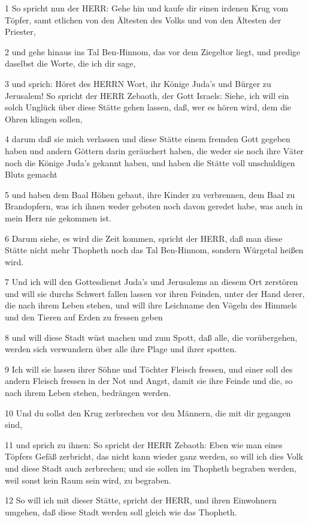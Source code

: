 \par 1 So spricht nun der HERR: Gehe hin und kaufe dir einen irdenen Krug vom Töpfer, samt etlichen von den Ältesten des Volks und von den Ältesten der Priester,
\par 2 und gehe hinaus ins Tal Ben-Hinnom, das vor dem Ziegeltor liegt, und predige daselbst die Worte, die ich dir sage,
\par 3 und sprich: Höret des HERRN Wort, ihr Könige Juda's und Bürger zu Jerusalem! So spricht der HERR Zebaoth, der Gott Israels: Siehe, ich will ein solch Unglück über diese Stätte gehen lassen, daß, wer es hören wird, dem die Ohren klingen sollen,
\par 4 darum daß sie mich verlassen und diese Stätte einem fremden Gott gegeben haben und andern Göttern darin geräuchert haben, die weder sie noch ihre Väter noch die Könige Juda's gekannt haben, und haben die Stätte voll unschuldigen Bluts gemacht
\par 5 und haben dem Baal Höhen gebaut, ihre Kinder zu verbrennen, dem Baal zu Brandopfern, was ich ihnen weder geboten noch davon geredet habe, was auch in mein Herz nie gekommen ist.
\par 6 Darum siehe, es wird die Zeit kommen, spricht der HERR, daß man diese Stätte nicht mehr Thopheth noch das Tal Ben-Hinnom, sondern Würgetal heißen wird.
\par 7 Und ich will den Gottesdienst Juda's und Jerusalems an diesem Ort zerstören und will sie durchs Schwert fallen lassen vor ihren Feinden, unter der Hand derer, die nach ihrem Leben stehen, und will ihre Leichname den Vögeln des Himmels und den Tieren auf Erden zu fressen geben
\par 8 und will diese Stadt wüst machen und zum Spott, daß alle, die vorübergehen, werden sich verwundern über alle ihre Plage und ihrer spotten.
\par 9 Ich will sie lassen ihrer Söhne und Töchter Fleisch fressen, und einer soll des andern Fleisch fressen in der Not und Angst, damit sie ihre Feinde und die, so nach ihrem Leben stehen, bedrängen werden.
\par 10 Und du sollst den Krug zerbrechen vor den Männern, die mit dir gegangen sind,
\par 11 und sprich zu ihnen: So spricht der HERR Zebaoth: Eben wie man eines Töpfers Gefäß zerbricht, das nicht kann wieder ganz werden, so will ich dies Volk und diese Stadt auch zerbrechen; und sie sollen im Thopheth begraben werden, weil sonst kein Raum sein wird, zu begraben.
\par 12 So will ich mit dieser Stätte, spricht der HERR, und ihren Einwohnern umgehen, daß diese Stadt werden soll gleich wie das Thopheth.
